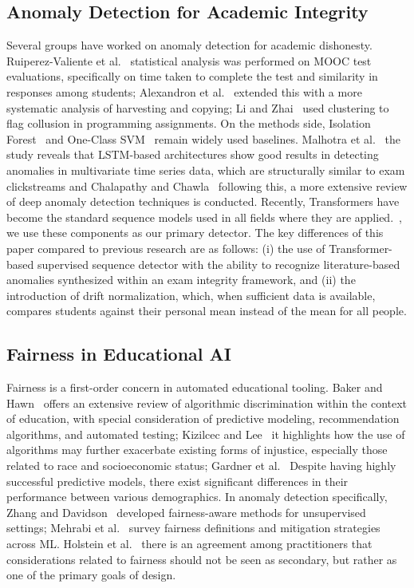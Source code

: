 \documentclass[sigconf]{acmart}
\begin{document}
\subsection{Anomaly Detection for Academic Integrity}
Several groups have worked on anomaly detection for academic dishonesty. Ruiperez-Valiente et al.~\cite{ruiperez2017detection} statistical analysis was performed on MOOC test evaluations, specifically on time taken to complete the test and similarity in responses among students; Alexandron et al.~\cite{alexandron2019fraud} extended this with a more systematic analysis of harvesting and copying; Li and Zhai~\cite{li2015detecting} used clustering to flag collusion in programming assignments. On the methods side, Isolation Forest~\cite{liu2008isolation} and One-Class SVM~\cite{scholkopf2001estimating} remain widely used baselines. Malhotra et al.~\cite{malhotra2016lstm} the study reveals that LSTM-based architectures show good results in detecting anomalies in multivariate time series data, which are structurally similar to exam clickstreams and Chalapathy and Chawla~\cite{chalapathy2019deep} following this, a more extensive review of deep anomaly detection techniques is conducted. Recently, Transformers have become the standard sequence models used in all fields where they are applied.~\cite{vaswani2017attention}, we use these components as our primary detector. The key differences of this paper compared to previous research are as follows: (i) the use of Transformer-based supervised sequence detector with the ability to recognize literature-based anomalies synthesized within an exam integrity framework, and (ii) the introduction of drift normalization, which, when sufficient data is available, compares students against their personal mean instead of the mean for all people.

\subsection{Fairness in Educational AI}
Fairness is a first-order concern in automated educational tooling. Baker and Hawn~\cite{baker2022algorithmic} offers an extensive review of algorithmic discrimination within the context of education, with special consideration of predictive modeling, recommendation algorithms, and automated testing; Kizilcec and Lee~\cite{kizilcec2022algorithmic} it highlights how the use of algorithms may further exacerbate existing forms of injustice, especially those related to race and socioeconomic status; Gardner et al.~\cite{gardner2019evaluating} Despite having highly successful predictive models, there exist significant differences in their performance between various demographics. In anomaly detection specifically, Zhang and Davidson~\cite{zhang2021fair} developed fairness-aware methods for unsupervised settings; Mehrabi et al.~\cite{mehrabi2021survey} survey fairness definitions and mitigation strategies across ML. Holstein et al.~\cite{holstein2019improving} there is an agreement among practitioners that considerations related to fairness should not be seen as secondary, but rather as one of the primary goals of design.
\end{document}
